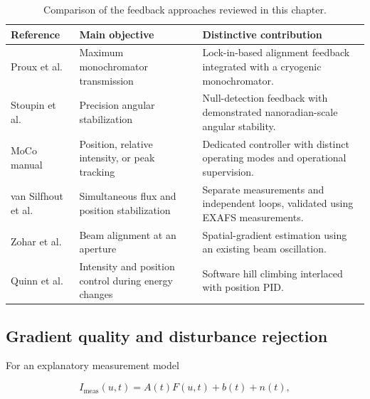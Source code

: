 \begin{table}[htbp]
    \centering
    \small
    \caption{Comparison of the feedback approaches reviewed in this chapter.}
    \label{tab:sota_comparison}
    \begin{tabularx}{\textwidth}{@{}p{}XX@{}}
        \toprule
        Reference & Main objective & Distinctive contribution \\
        \midrule
        Proux et al.\ \cite{Proux2006}
        & Maximum monochromator transmission
        & Lock-in-based alignment feedback integrated with
          a cryogenic monochromator. \\
        Stoupin et al.\ \cite{Stoupin2010}
        & Precision angular stabilization
        & Null-detection feedback with demonstrated
          nanoradian-scale angular stability. \\
        MoCo manual \cite{MoCo2008}
        & Position, relative intensity, or peak tracking
        & Dedicated controller with distinct operating modes
          and operational supervision. \\
        van Silfhout et al.\ \cite{vanSilfhout2014}
        & Simultaneous flux and position stabilization
        & Separate measurements and independent loops,
          validated using EXAFS measurements. \\
        Zohar et al.\ \cite{Zohar2016}
        & Beam alignment at an aperture
        & Spatial-gradient estimation using an existing
          beam oscillation. \\
        Quinn et al.\ \cite{Quinn2021}
        & Intensity and position control during energy changes
        & Software hill climbing interlaced with position PID. \\
        \bottomrule
    \end{tabularx}
\end{table}

\subsection{Gradient quality and disturbance rejection}

For an explanatory measurement model

\begin{equation}
    I_{\mathrm{meas}}(u,t)
    =
    A(t)F(u,t)+b(t)+n(t),
    \label{eq:intensity_measurement_model}
\end{equation}

